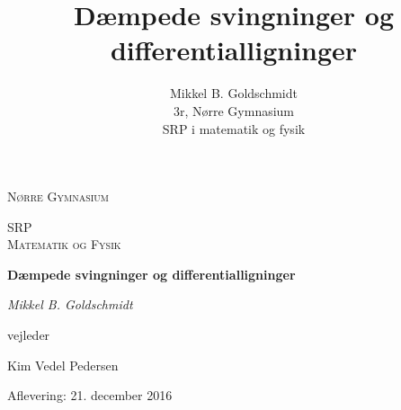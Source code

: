 \documentclass[11pt,a4paper,openany,oneside]{book}
\author{Mikkel B. Goldschmidt \\ 3r, Nørre Gymnasium \\ SRP i matematik og fysik}
\title{Dæmpede svingninger og differentialligninger}
\begin{document}


\begin{titlepage}
	\centering
	
	{\scshape\LARGE Nørre Gymnasium\par}
	\vspace{1cm}
	{\scshape\Large SRP \\ \large Matematik og Fysik\par}
	\vspace{1.5cm}
	{\huge\bfseries Dæmpede svingninger og differentialligninger\par}
	\vspace{2cm}
	{\Large\itshape Mikkel B. Goldschmidt\par}
	
	
	\vfill
	vejleder\par
	Kim Vedel Pedersen
	\vfill

	{\large Aflevering: 21. december 2016\par}
\end{titlepage}


\begin{singlespacing}
\tableofcontents
\end{singlespacing}
\pagebreak


























\end{document}
